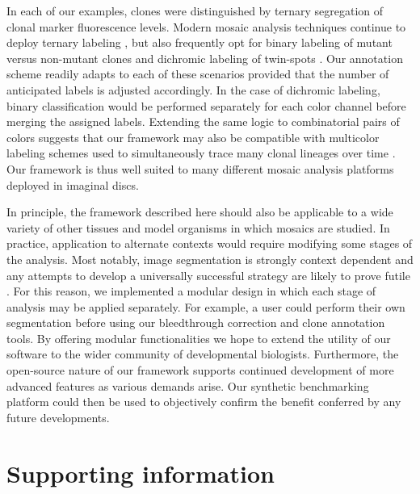 \documentclass[10pt,letterpaper]{article}
\begin{document}
In each of our examples, clones were distinguished by ternary segregation of clonal marker fluorescence levels. Modern mosaic analysis techniques continue to deploy ternary labeling \cite{Gambis2011,Dourlen2013}, but also frequently opt for binary labeling of mutant versus non-mutant clones \cite{Fisher2017,Wu2007,Zhou2016} and dichromic labeling of twin-spots \cite{Heffern2009,Yu2010}. Our annotation scheme readily adapts to each of these scenarios provided that the number of anticipated labels is adjusted accordingly. In the case of dichromic labeling, binary classification would be performed separately for each color channel before merging the assigned labels. Extending the same logic to combinatorial pairs of colors suggests that our framework may also be compatible with multicolor labeling schemes used to simultaneously trace many clonal lineages over time \cite{Denes2013,Hadjieconomou2011,Hampel2011}. Our framework is thus well suited to many different mosaic analysis platforms deployed in imaginal discs.

In principle, the framework described here should also be applicable to a wide variety of other tissues \cite{Neufeld1998,Tworoger1999} and model organisms \cite{Collins2010,Munoz-Jimenez2017,Wang2007} in which mosaics are studied. In practice, application to alternate contexts would require modifying some stages of the analysis. Most notably, image segmentation is strongly context dependent and any attempts to develop a universally successful strategy are likely to prove futile \cite{Meijering2012}. For this reason, we implemented a modular design in which each stage of analysis may be applied separately. For example, a user could perform their own segmentation before using our bleedthrough correction and clone annotation tools. By offering modular functionalities we hope to extend the utility of our software to the wider community of developmental biologists. Furthermore, the open-source nature of our framework supports continued development of more advanced features as various demands arise. Our synthetic benchmarking platform could then be used to objectively confirm the benefit conferred by any future developments.



\section*{Supporting information}

\end{document}
